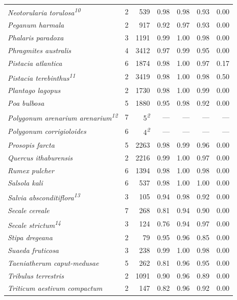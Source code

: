 \documentclass[
  authoryear,
  preprint]{elsarticle}
\begin{document}
\begin{longtable}{@{\extracolsep{\fill}}lrrrrrr}
{\itshape Neotorularia torulosa}\textsuperscript{\textit{10}} & 2 & 539 & 0.98 & 0.98 & 0.93 & 0.00 \\ 
{\itshape Peganum harmala} & 2 & 917 & 0.92 & 0.97 & 0.93 & 0.00 \\ 
{\itshape Phalaris paradoxa} & 3 & 1191 & 0.99 & 1.00 & 0.98 & 0.00 \\ 
{\itshape Phragmites australis} & 4 & 3412 & 0.97 & 0.99 & 0.95 & 0.00 \\ 
{\itshape Pistacia atlantica} & 6 & 1874 & 0.98 & 1.00 & 0.97 & 0.17 \\ 
{\itshape Pistacia terebinthus}\textsuperscript{\textit{11}} & 2 & 3419 & 0.98 & 1.00 & 0.98 & 0.50 \\ 
{\itshape Plantago lagopus} & 2 & 1730 & 0.98 & 1.00 & 0.99 & 0.00 \\ 
{\itshape Poa bulbosa} & 5 & 1880 & 0.95 & 0.98 & 0.92 & 0.00 \\ 
{\itshape Polygonum arenarium arenarium}\textsuperscript{\textit{12}} & 7 & 5\textsuperscript{\textit{2}} & — & — & — & — \\ 
{\itshape Polygonum corrigioloides} & 6 & 4\textsuperscript{\textit{2}} & — & — & — & — \\ 
{\itshape Prosopis farcta} & 5 & 2263 & 0.98 & 0.99 & 0.96 & 0.00 \\ 
{\itshape Quercus ithaburensis} & 2 & 2216 & 0.99 & 1.00 & 0.97 & 0.00 \\ 
{\itshape Rumex pulcher} & 6 & 1394 & 0.98 & 1.00 & 0.98 & 0.00 \\ 
{\itshape Salsola kali} & 6 & 537 & 0.98 & 1.00 & 1.00 & 0.00 \\ 
{\itshape Salvia absconditiflora}\textsuperscript{\textit{13}} & 3 & 105 & 0.94 & 0.98 & 0.92 & 0.00 \\ 
{\itshape Secale cereale} & 7 & 268 & 0.81 & 0.94 & 0.90 & 0.00 \\ 
{\itshape Secale strictum}\textsuperscript{\textit{14}} & 3 & 124 & 0.76 & 0.94 & 0.97 & 0.00 \\ 
{\itshape Stipa dregeana} & 2 & 79 & 0.95 & 0.96 & 0.85 & 0.00 \\ 
{\itshape Suaeda fruticosa} & 3 & 238 & 0.99 & 1.00 & 0.98 & 0.00 \\ 
{\itshape Taeniatherum caput-medusae} & 5 & 262 & 0.81 & 0.96 & 0.95 & 0.00 \\ 
{\itshape Tribulus terrestris} & 2 & 1091 & 0.90 & 0.96 & 0.89 & 0.00 \\ 
{\itshape Triticum aestivum compactum} & 2 & 147 & 0.82 & 0.96 & 0.92 & 0.00 \\ 

\end{longtable}
\end{document}
